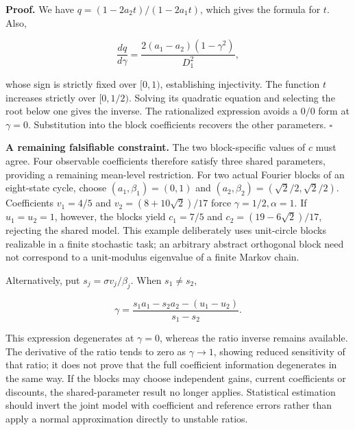 \documentclass[11pt,a4paper]{article}
\begin{document}
\par
\noindent\begin{minipage}{\linewidth}

\textbf{Proof.} We have \(q=(1-2a_2t)/(1-2a_1t)\), which gives the
formula for \(t\). Also,

\[
\frac{dq}{d\gamma}
=\frac{2(a_1-a_2)(1-\gamma^2)}{D_1^2},
\]

\end{minipage}\par

whose sign is strictly fixed over \([0,1)\), establishing injectivity.
The function \(t\) increases strictly over \([0,1/2)\). Solving its
quadratic equation and selecting the root below one gives the inverse.
The rationalized expression avoids a \(0/0\) form at \(\gamma=0\).
Substitution into the block coefficients recovers the other parameters.
\(\square\)

\textbf{A remaining falsifiable constraint.} The two block-specific
values of \(c\) must agree. Four observable coefficients therefore
satisfy three shared parameters, providing a remaining mean-level
restriction. For two actual Fourier blocks of an eight-state cycle,
choose \((a_1,\beta_1)=(0,1)\) and
\((a_2,\beta_2)=(\sqrt2/2,\sqrt2/2)\). Coefficients \(v_1=4/5\) and
\(v_2=(8+10\sqrt2)/17\) force \(\gamma=1/2,\alpha=1\). If \(u_1=u_2=1\),
however, the blocks yield \(c_1=7/5\) and \(c_2=(19-6\sqrt2)/17\),
rejecting the shared model. This example deliberately uses unit-circle
blocks realizable in a finite stochastic task; an arbitrary abstract
orthogonal block need not correspond to a unit-modulus eigenvalue of a
finite Markov chain.

\par
\noindent\begin{minipage}{\linewidth}

Alternatively, put \(s_j=\sigma v_j/\beta_j\). When \(s_1\ne s_2\),

\[
\gamma=\frac{s_1a_1-s_2a_2-(u_1-u_2)}{s_1-s_2}.
\]

\end{minipage}\par

This expression degenerates at \(\gamma=0\), whereas the ratio inverse
remains available. The derivative of the ratio tends to zero as
\(\gamma\to1\), showing reduced sensitivity of that ratio; it does not
prove that the full coefficient information degenerates in the same way.
If the blocks may choose independent gains, current coefficients or
discounts, the shared-parameter result no longer applies. Statistical
estimation should invert the joint model with coefficient and reference
errors rather than apply a normal approximation directly to unstable
ratios.
\end{document}
